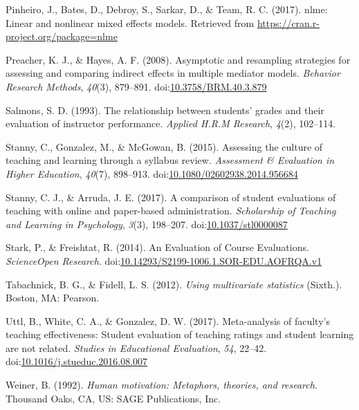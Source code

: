 \documentclass[,man]{apa6}
\theoremstyle{definition}
\theoremstyle{definition}
\theoremstyle{definition}
\theoremstyle{remark}
\begin{document}
\leavevmode\hypertarget{ref-Pinheiro2017}{}%
Pinheiro, J., Bates, D., Debroy, S., Sarkar, D., \& Team, R. C. (2017).
nlme: Linear and nonlinear mixed effects models. Retrieved from
\url{https://cran.r-project.org/package=nlme}

\leavevmode\hypertarget{ref-Preacher2008}{}%
Preacher, K. J., \& Hayes, A. F. (2008). Asymptotic and resampling
strategies for assessing and comparing indirect effects in multiple
mediator models. \emph{Behavior Research Methods}, \emph{40}(3),
879--891.
doi:\href{https://doi.org/10.3758/BRM.40.3.879}{10.3758/BRM.40.3.879}

\leavevmode\hypertarget{ref-Salmons1993}{}%
Salmons, S. D. (1993). The relationship between students' grades and
their evaluation of instructor performance. \emph{Applied H.R.M
Research}, \emph{4}(2), 102--114.

\leavevmode\hypertarget{ref-Stanny2015}{}%
Stanny, C., Gonzalez, M., \& McGowan, B. (2015). Assessing the culture
of teaching and learning through a syllabus review. \emph{Assessment \&
Evaluation in Higher Education}, \emph{40}(7), 898--913.
doi:\href{https://doi.org/10.1080/02602938.2014.956684}{10.1080/02602938.2014.956684}

\leavevmode\hypertarget{ref-Stanny2017}{}%
Stanny, C. J., \& Arruda, J. E. (2017). A comparison of student
evaluations of teaching with online and paper-based administration.
\emph{Scholarship of Teaching and Learning in Psychology}, \emph{3}(3),
198--207.
doi:\href{https://doi.org/10.1037/stl0000087}{10.1037/stl0000087}

\leavevmode\hypertarget{ref-Stark2014}{}%
Stark, P., \& Freishtat, R. (2014). An Evaluation of Course Evaluations.
\emph{ScienceOpen Research}.
doi:\href{https://doi.org/10.14293/S2199-1006.1.SOR-EDU.AOFRQA.v1}{10.14293/S2199-1006.1.SOR-EDU.AOFRQA.v1}

\leavevmode\hypertarget{ref-Tabachnick2012}{}%
Tabachnick, B. G., \& Fidell, L. S. (2012). \emph{Using multivariate
statistics} (Sixth.). Boston, MA: Pearson.

\leavevmode\hypertarget{ref-Uttl2017}{}%
Uttl, B., White, C. A., \& Gonzalez, D. W. (2017). Meta-analysis of
faculty's teaching effectiveness: Student evaluation of teaching ratings
and student learning are not related. \emph{Studies in Educational
Evaluation}, \emph{54}, 22--42.
doi:\href{https://doi.org/10.1016/j.stueduc.2016.08.007}{10.1016/j.stueduc.2016.08.007}

\leavevmode\hypertarget{ref-Weiner1992}{}%
Weiner, B. (1992). \emph{Human motivation: Metaphors, theories, and
research}. Thousand Oaks, CA, US: SAGE Publications, Inc.
\end{document}
